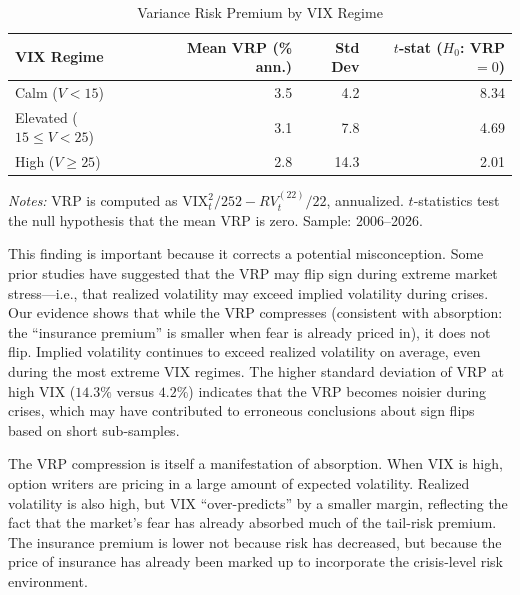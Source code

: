 \documentclass[12pt,a4paper]{article}
\begin{document}
\begin{table}[H]
\centering
\caption{Variance Risk Premium by VIX Regime}
\label{tab:vrp}
\begin{threeparttable}
\begin{tabular}{lrrr}
\toprule
VIX Regime & Mean VRP (\% ann.) & Std Dev & $t$-stat ($H_0$: VRP $= 0$) \\
\midrule
Calm ($V < 15$)         & 3.5 & 4.2 & 8.34 \\
Elevated ($15 \leq V < 25$) & 3.1 & 7.8 & 4.69 \\
High ($V \geq 25$)      & 2.8 & 14.3 & 2.01 \\
\bottomrule
\end{tabular}
\begin{tablenotes}
\small
\item \textit{Notes:} VRP is computed as $\text{VIX}_t^2 / 252 - RV_t^{(22)} / 22$, annualized. $t$-statistics test the null hypothesis that the mean VRP is zero. Sample: 2006--2026.
\end{tablenotes}
\end{threeparttable}
\end{table}

This finding is important because it corrects a potential misconception. Some prior studies have suggested that the VRP may flip sign during extreme market stress---i.e., that realized volatility may exceed implied volatility during crises. Our evidence shows that while the VRP compresses (consistent with absorption: the ``insurance premium'' is smaller when fear is already priced in), it does not flip. Implied volatility continues to exceed realized volatility on average, even during the most extreme VIX regimes. The higher standard deviation of VRP at high VIX ($14.3\%$ versus $4.2\%$) indicates that the VRP becomes noisier during crises, which may have contributed to erroneous conclusions about sign flips based on short sub-samples.

The VRP compression is itself a manifestation of absorption. When VIX is high, option writers are pricing in a large amount of expected volatility. Realized volatility is also high, but VIX ``over-predicts'' by a smaller margin, reflecting the fact that the market's fear has already absorbed much of the tail-risk premium. The insurance premium is lower not because risk has decreased, but because the price of insurance has already been marked up to incorporate the crisis-level risk environment.


\end{document}
